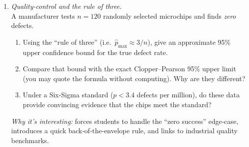 \documentclass[11pt]{article}
\begin{document}
\begin{enumerate}[label=\textbf{Q\,\arabic*:}, start=6, left=0pt]
\item  \emph{Quality‑control and the rule of three.}  \\
      A manufacturer tests $n=120$ randomly selected microchips and finds \emph{zero} defects.  
      \begin{enumerate}[label=(\alph*)]
          \item Using the “rule of three” (i.e.\ $\hat{p}_{\max}\approx 3/n$), give an approximate 95\% upper confidence bound for the true defect rate.  
          \item Compare that bound with the exact Clopper–Pearson 95\% upper limit (you may quote the formula without computing).  Why are they different?  
          \item Under a Six‑Sigma standard ($p<3.4$ defects per million), do these data provide convincing evidence that the chips meet the standard?
      \end{enumerate}
      \textit{Why it’s interesting:} forces students to handle the “zero success” edge‑case, introduces a quick back‑of‑the‑envelope rule, and links to industrial quality benchmarks.  

\end{enumerate}
\end{document}
